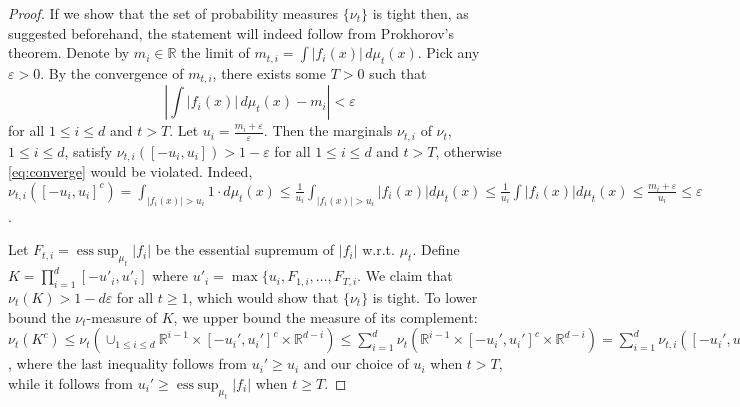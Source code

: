 \documentclass[english]{article} %
\DeclareMathOperator{\esssup}{ess\;sup}
\newcommand{\real}{\mathbb{R}}
\theoremstyle{definition}
\newcommand{\eps}{\varepsilon}
\begin{document}
\begin{proof}
If we show that the set of probability measures $\{\nu_t\}$ is tight then, as suggested beforehand,
the statement will indeed follow from Prokhorov's theorem.
Denote by $m_i\in \mathbb{R}$ the limit of $ m_{t,i} = \int |f_i(x)|\, d\mu_t(x)$.
Pick any $\eps>0$.
By the convergence of $m_{t,i}$, there exists some $T>0$ such that
\begin{equation}
\label{eq:converge}
\left| \int |f_i(x)|\, d\mu_t (x)- m_i \right| <\eps
\end{equation}
for all $1 \le i \le d$ and $t>T$. Let $u_{i}=\tfrac{m_i+\eps}{\eps}$. Then the marginals
$\nu_{t,i}$ of $\nu_t$, $1\le i \le d$, satisfy $\nu_{t,i}([-u_{i},u_{i}]) > 1-\eps$ for all $1\le i\le d$ and $t>T$, otherwise \eqref{eq:converge} would be violated. 
Indeed, $\nu_{t,i}([-u_i,u_i]^c)=\int_{|f_i(x)|>u_i} 1\cdot d\mu_t(x)
\le \frac{1}{u_i}\int_{|f_i(x)|>u_i} |f_i(x)| d\mu_t(x)
\le \frac{1}{u_i} \int |f_i(x)| d\mu_t(x) \le \frac{m_i+\eps}{u_i}\le \eps$.

Let $F_{t,i} = \esssup_{\mu_t} |f_i|$ be the essential supremum of $|f_i|$ w.r.t. $\mu_t$.
Define 
$K=\prod_{i=1}^d [-u'_{i},u'_{i}]$ where $u'_{i}=\max\{u_{i},F_{1,i}, \ldots,F_{T,i}$.
We claim that 
$\nu_t(K)>1-d \eps$ for all $t \ge 1$, which would show that $\{\nu_t\}$ is tight.
To lower bound the $\nu_t$-measure of $K$, we upper bound the measure of its complement:
$\nu_t(K^c) \le \nu_t( \cup_{1\le i \le d} \real^{i-1} \times [-u_i',u_i']^c \times \real^{d-i})
\le \sum_{i=1}^d \nu_t( \real^{i-1} \times [-u_i',u_i']^c \times \real^{d-i})
=   \sum_{i=1}^d \nu_{t,i}( [-u_i',u_i']^c )
\le d \eps$, where the last inequality follows from $u_i'\ge u_i$ and our choice of $u_i$ when $t>T$,
while it follows from $u_i'\ge \esssup_{\mu_t} |f_i|$ when $t\ge T$.
\end{proof}
\end{document}
